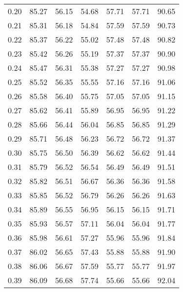 \begin{tabular}{|c|c|c|c|c|c|c|}
      0.20 &     85.27 &     56.15 &      54.68 &   57.71 &      57.71 &         90.65 \\
      0.21 &     85.31 &     56.18 &      54.84 &   57.59 &      57.59 &         90.73 \\
      0.22 &     85.37 &     56.22 &      55.02 &   57.48 &      57.48 &         90.82 \\
      0.23 &     85.42 &     56.26 &      55.19 &   57.37 &      57.37 &         90.90 \\
      0.24 &     85.47 &     56.31 &      55.38 &   57.27 &      57.27 &         90.98 \\
      0.25 &     85.52 &     56.35 &      55.55 &   57.16 &      57.16 &         91.06 \\
      0.26 &     85.58 &     56.40 &      55.75 &   57.05 &      57.05 &         91.15 \\
      0.27 &     85.62 &     56.41 &      55.89 &   56.95 &      56.95 &         91.22 \\
      0.28 &     85.66 &     56.44 &      56.04 &   56.85 &      56.85 &         91.29 \\
      0.29 &     85.71 &     56.48 &      56.23 &   56.72 &      56.72 &         91.37 \\
      0.30 &     85.75 &     56.50 &      56.39 &   56.62 &      56.62 &         91.44 \\
      0.31 &     85.79 &     56.52 &      56.54 &   56.49 &      56.49 &         91.51 \\
      0.32 &     85.82 &     56.51 &      56.67 &   56.36 &      56.36 &         91.58 \\
      0.33 &     85.85 &     56.52 &      56.79 &   56.26 &      56.26 &         91.63 \\
      0.34 &     85.89 &     56.55 &      56.95 &   56.15 &      56.15 &         91.71 \\
      0.35 &     85.93 &     56.57 &      57.11 &   56.04 &      56.04 &         91.77 \\
      0.36 &     85.98 &     56.61 &      57.27 &   55.96 &      55.96 &         91.84 \\
      0.37 &     86.02 &     56.65 &      57.43 &   55.88 &      55.88 &         91.90 \\
      0.38 &     86.06 &     56.67 &      57.59 &   55.77 &      55.77 &         91.97 \\
      0.39 &     86.09 &     56.68 &      57.74 &   55.66 &      55.66 &         92.04 \\

\end{tabular}
